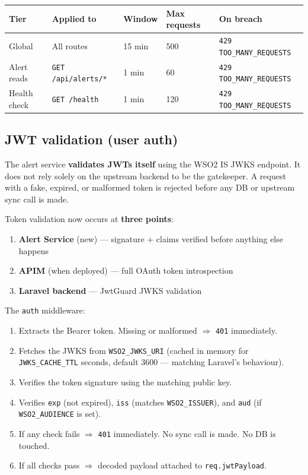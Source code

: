 \documentclass[11pt]{article}
\begin{document}
\begin{table}[h]
\small
\begin{tabularx}{\textwidth}{l l l l X}
\toprule
\textbf{Tier} & \textbf{Applied to} & \textbf{Window} & \textbf{Max requests} & \textbf{On breach} \\
\midrule
Global & All routes & 15 min & 500 & \texttt{429 TOO\_MANY\_REQUESTS} \\
Alert reads & \texttt{GET /api/alerts/*} & 1 min & 60 & \texttt{429 TOO\_MANY\_REQUESTS} \\
Health check & \texttt{GET /health} & 1 min & 120 & \texttt{429 TOO\_MANY\_REQUESTS} \\
\bottomrule
\end{tabularx}
\end{table}

\subsection{JWT validation (user auth)}

\begin{warnbox}
The alert service \textbf{validates JWTs itself} using the WSO2 IS JWKS endpoint. It does not
rely solely on the upstream backend to be the gatekeeper. A request with a fake, expired, or
malformed token is rejected before any DB or upstream sync call is made.
\end{warnbox}

Token validation now occurs at \textbf{three points}:
\begin{enumerate}
  \item \textbf{Alert Service} (new) --- signature + claims verified before anything else happens
  \item \textbf{APIM} (when deployed) --- full OAuth token introspection
  \item \textbf{Laravel backend} --- JwtGuard JWKS validation
\end{enumerate}

The \texttt{auth} middleware:
\begin{enumerate}
  \item Extracts the Bearer token. Missing or malformed $\Rightarrow$ \texttt{401} immediately.
  \item Fetches the JWKS from \texttt{WSO2\_JWKS\_URI} (cached in memory for \texttt{JWKS\_CACHE\_TTL}
        seconds, default 3600 --- matching Laravel's behaviour).
  \item Verifies the token signature using the matching public key.
  \item Verifies \texttt{exp} (not expired), \texttt{iss} (matches \texttt{WSO2\_ISSUER}),
        and \texttt{aud} (if \texttt{WSO2\_AUDIENCE} is set).
  \item If any check fails $\Rightarrow$ \texttt{401} immediately. No sync call is made.
        No DB is touched.
  \item If all checks pass $\Rightarrow$ decoded payload attached to \texttt{req.jwtPayload}.
\end{enumerate}
\end{document}
